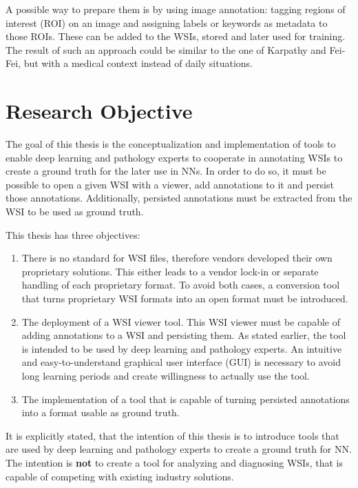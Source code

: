 A possible way to prepare them is by using image annotation: tagging regions of interest (ROI) on an image and assigning labels or keywords as metadata to those ROIs. These can be added to the WSIs, stored and later used for training. The result of such an approach could be similar to the one of Karpathy and Fei-Fei\cite{Karpathy15}, but with a medical context instead of daily situations.


\section{Research Objective}
\label{sec1_researchObjective}
The goal of this thesis is the conceptualization and implementation of tools to enable deep learning and pathology experts to cooperate in annotating WSIs to create a ground truth for the later use in NNs. In order to do so, it must be possible to open a given WSI with a viewer, add annotations to it and persist those annotations. Additionally, persisted annotations must be extracted from the WSI to be used as ground truth.

This thesis has three objectives:
\begin{enumerate}[(1)]
	\item There is no standard for WSI files, therefore vendors developed their own proprietary solutions\cite{Cornish13}. This either leads to a vendor lock-in or separate handling of each proprietary format. To avoid both cases, a conversion tool that turns proprietary WSI formats into an open format must be introduced.
	\item The deployment of a WSI viewer tool. This WSI viewer must be capable of adding annotations to a WSI and persisting them. As stated earlier, the tool is intended to be used by deep learning and pathology experts. An intuitive and easy-to-understand graphical user interface (GUI) is necessary to avoid long learning periods and create willingness to actually use the tool.
	\item The implementation of a tool that is capable of turning persisted annotations into a format usable as ground truth.
\end{enumerate}

It is explicitly stated, that the intention of this thesis is to introduce tools that are used by deep learning and pathology experts to create a ground truth for NN. The intention is \textbf{not} to create a tool for analyzing and diagnosing WSIs, that is capable of competing with existing industry solutions.


